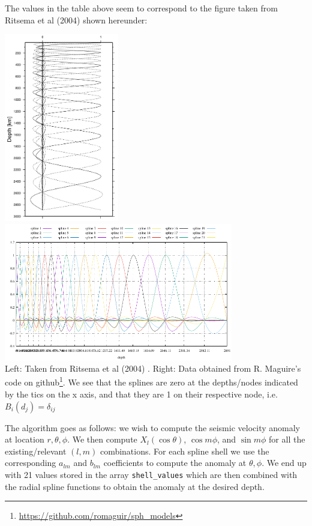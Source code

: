 The values in the table above seem to correspond to the figure taken from 
Ritsema et al (2004) \cite{rivw04} shown hereunder: 
\begin{center}
\includegraphics[width=5cm]{python_codes/fieldstone_85/images/rivw04splines}
\includegraphics[width=10cm]{python_codes/fieldstone_85/splines/splines.pdf}\\
{\captionfont Left: Taken from Ritsema et al (2004) \cite{rivw04}.
Right: Data obtained from R. Maguire's code on github\footnote{\url{https://github.com/romaguir/sph_models}}.
We see that the splines are zero at the depths/nodes 
indicated by the tics on the x axis, and that 
they are 1 on their respective node, i.e. $B_i(d_j)=\delta_{ij}$}
\end{center}

The algorithm goes as follows: we wish to compute the seismic velocity anomaly at location $r,\theta,\phi$.
We then compute $X_l(\cos \theta)$, $\cos m\phi$, and $\sin m\phi$ for all the existing/relevant $(l,m)$ 
combinations. For each spline shell we use the corresponding $a_{lm}$ and $b_{lm}$ coefficients to compute the 
anomaly at $\theta,\phi$. We end up with 21 values stored in the array {\tt shell\_values} 
which are then combined with the radial spline functions to obtain the anomaly at the desired depth.

